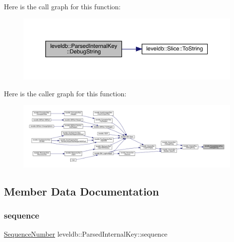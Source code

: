 Here is the call graph for this function\+:
\nopagebreak
\begin{figure}[H]
\begin{center}
\leavevmode
\includegraphics[width=350pt]{structleveldb_1_1_parsed_internal_key_a5371a83d503751e8ea7cc23fa16c8bfd_cgraph}
\end{center}
\end{figure}
Here is the caller graph for this function\+:
\nopagebreak
\begin{figure}[H]
\begin{center}
\leavevmode
\includegraphics[width=350pt]{structleveldb_1_1_parsed_internal_key_a5371a83d503751e8ea7cc23fa16c8bfd_icgraph}
\end{center}
\end{figure}


\subsection{Member Data Documentation}
\mbox{\label{structleveldb_1_1_parsed_internal_key_a3ab7f4382bc026081875fde4dea95e61}} 
\subsubsection{\texorpdfstring{sequence}{sequence}}
{\footnotesize\ttfamily \mbox{\hyperlink{namespaceleveldb_a5481ededd221c36d652c371249f869fa}{Sequence\+Number}} leveldb\+::\+Parsed\+Internal\+Key\+::sequence}

\mbox{\label{structleveldb_1_1_parsed_internal_key_ac7c10a6f60f93982b886ad1fbbafd6c2}} 
